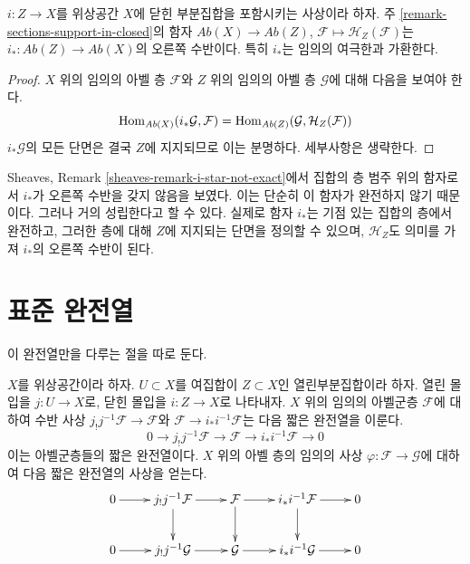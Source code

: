 \begin{lemma}
\label{lemma-i-star-right-adjoint}
$i : Z \to X$를 위상공간 $X$에 닫힌 부분집합을 포함시키는 사상이라 하자.
주 \ref{remark-sections-support-in-closed}의 함자
$\textit{Ab}(X) \to \textit{Ab}(Z)$, $\mathcal{F} \mapsto \mathcal{H}_Z(\mathcal{F})$는
$i_* : \textit{Ab}(Z) \to \textit{Ab}(X)$의 오른쪽 수반이다.
특히 $i_*$는 임의의 여극한과 가환한다.
\end{lemma}

\begin{proof}
$X$ 위의 임의의 아벨 층 $\mathcal{F}$와 $Z$ 위의 임의의 아벨 층
$\mathcal{G}$에 대해 다음을 보여야 한다.
$$
\mathop{\mathrm{Hom}}\nolimits_{\textit{Ab}(X)}(i_*\mathcal{G}, \mathcal{F}) =
\mathop{\mathrm{Hom}}\nolimits_{\textit{Ab}(Z)}(\mathcal{G}, \mathcal{H}_Z(\mathcal{F}))
$$
$i_*\mathcal{G}$의 모든 단면은 결국 $Z$에 지지되므로 이는 분명하다.
세부사항은 생략한다.
\end{proof}

\begin{remark}
\label{remark-i-star-right-adjoint}
Sheaves, Remark \ref{sheaves-remark-i-star-not-exact}에서 집합의 층 범주 위의
함자로서 $i_*$가 오른쪽 수반을 갖지 않음을 보였다. 이는 단순히 이 함자가
완전하지 않기 때문이다. 그러나 거의 성립한다고 할 수 있다. 실제로 함자
$i_*$는 기점 있는 집합의 층에서 완전하고, 그러한 층에 대해 $Z$에 지지되는
단면을 정의할 수 있으며, $\mathcal{H}_Z$도 의미를 가져 $i_*$의 오른쪽 수반이 된다.
\end{remark}









\section{표준 완전열}
\label{section-canonical-exact-sequence}

\noindent
이 완전열만을 다루는 절을 따로 둔다.

\begin{lemma}
\label{lemma-canonical-exact-sequence}
$X$를 위상공간이라 하자.
$U \subset X$를 여집합이 $Z \subset X$인 열린부분집합이라 하자.
열린 몰입을 $j : U \to X$로, 닫힌 몰입을
$i : Z \to X$로 나타내자.
$X$ 위의 임의의 아벨군층 $\mathcal{F}$에 대하여
수반 사상 $j_{!}j^{-1}\mathcal{F} \to \mathcal{F}$와
$\mathcal{F} \to i_*i^{-1}\mathcal{F}$는 다음 짧은 완전열을 이룬다.
$$
0 \to j_{!}j^{-1}\mathcal{F} \to \mathcal{F} \to i_*i^{-1}\mathcal{F} \to 0
$$
이는 아벨군층들의 짧은 완전열이다. $X$ 위의 아벨 층의 임의의 사상
$\varphi : \mathcal{F} \to \mathcal{G}$에 대하여
다음 짧은 완전열의 사상을 얻는다.
$$
\xymatrix{
0 \ar[r] &
j_{!}j^{-1}\mathcal{F} \ar[r] \ar[d] &
\mathcal{F} \ar[r] \ar[d] &
i_*i^{-1}\mathcal{F} \ar[r] \ar[d] &
0 \\
0 \ar[r] &
j_{!}j^{-1}\mathcal{G} \ar[r] &
\mathcal{G} \ar[r] &
i_*i^{-1}\mathcal{G} \ar[r] &
0
}
$$
\end{lemma}


